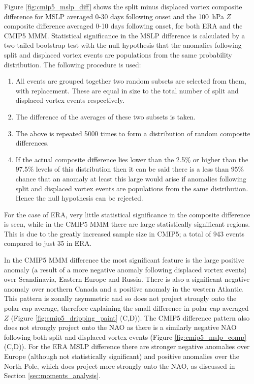 \bigskip Figure \ref{fig:cmip5_mslp_diff} shows the split minus displaced vortex
composite difference for MSLP averaged 0-30 days following onset and the 100~hPa
$Z$ composite difference averaged 0-10 days following onset, for both ERA and
the CMIP5 MMM. Statistical significance in the MSLP difference is calculated by
a two-tailed bootstrap test with the null hypothesis that the anomalies
following split and displaced vortex events are populations from the same
probability distribution. The following procedure is used:
\begin{enumerate}
\item All events are grouped together two random subsets are selected from them,
  with replacement. These are equal in size to the total number of split and
  displaced vortex events respectively.
\item The difference of the averages of these two subsets is taken.
\item The above is repeated 5000 times to form a distribution of random
  composite differences.
\item If the actual composite difference lies lower than the 2.5\% or higher
  than the 97.5\% levels of this distribution then it can be said there is a
  less than 95\% chance that an anomaly at least this large would arise if
  anomalies following split and displaced vortex events are populations from the
  same distribution. Hence the null hypothesis can be rejected.
\end{enumerate}
For the case of ERA, very little statistical significance in the
composite difference is seen, while in the CMIP5 MMM there are large
statistically significant regions. This is due to the greatly increased sample
size in CMIP5; a total of 943 events compared to just 35 in ERA. 

In the CMIP5 MMM difference the most significant feature is the large positive
anomaly (a result of a more negative anomaly following displaced vortex events)
over Scandinavia, Eastern Europe and Russia. There is also a significant
negative anomaly over northern Canada and a positive anomaly in the western
Atlantic. This pattern is zonally asymmetric and so does not project strongly
onto the polar cap average, therefore explaining the small difference in polar
cap averaged $Z$ (Figure \ref{fig:cmip5_dripping_paint} (C,D)). The CMIP5
difference pattern also does not strongly project onto the NAO as there is a
similarly negative NAO following both split and displaced vortex events (Figure
\ref{fig:cmip5_mslp_comp} (C,D)). For the ERA MSLP difference there are stronger
negative anomalies over Europe (although not statistically significant) and
positive anomalies over the North Pole, which does project more strongly onto
the NAO, as discussed in Section \ref{sec:moments_analysis}.

